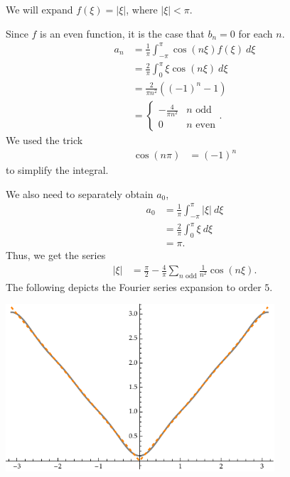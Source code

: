 \documentclass[10pt]{mypackage}
\begin{document}
\begin{example}
  We will expand $f\left(\xi\right) = \left\vert \xi \right\vert$, where $\left\vert \xi \right\vert < \pi$.\newline

  Since $f$ is an even function, it is the case that $b_n = 0$ for each $n$. 
  \begin{align*}
    a_n &= \frac{1}{\pi}\int_{-\pi}^{\pi} \cos\left(n\xi\right)f\left(\xi\right)\:d\xi\\
        &= \frac{2}{\pi}\int_{0}^{\pi} \xi \cos\left(n\xi\right)\:d\xi\\
        &= \frac{2}{\pi n^2} \left(\left(-1\right)^n-1\right)\\
        &= \begin{cases}
          -\frac{4}{\pi n^2} & n\text{ odd}\\
          0 & n\text{ even}
        \end{cases}.
  \end{align*}
  We used the trick
  \begin{align*}
    \cos\left(n\pi\right) &= \left(-1\right)^n
  \end{align*}
  to simplify the integral.\newline

  We also need to separately obtain $a_0$, 
  \begin{align*}
  a_0 &= \frac{1}{\pi}\int_{-\pi}^{\pi} \left\vert \xi \right\vert\:d\xi\\
      &= \frac{2}{\pi}\int_{0}^{\pi} \xi\:d\xi\\
      &= \pi.
  \end{align*}
  Thus, we get the series
  \begin{align*}
    \left\vert \xi \right\vert &= \frac{\pi}{2} - \frac{4}{\pi}\sum_{n\text{ odd}} \frac{1}{n^2}\cos\left(n\xi\right).
  \end{align*}
  The following depicts the Fourier series expansion to order $5$.
  \begin{center}
    \includegraphics[width=10cm]{images/fourier_series_abs_x.pdf}
  \end{center}
\end{example}
\end{document}
